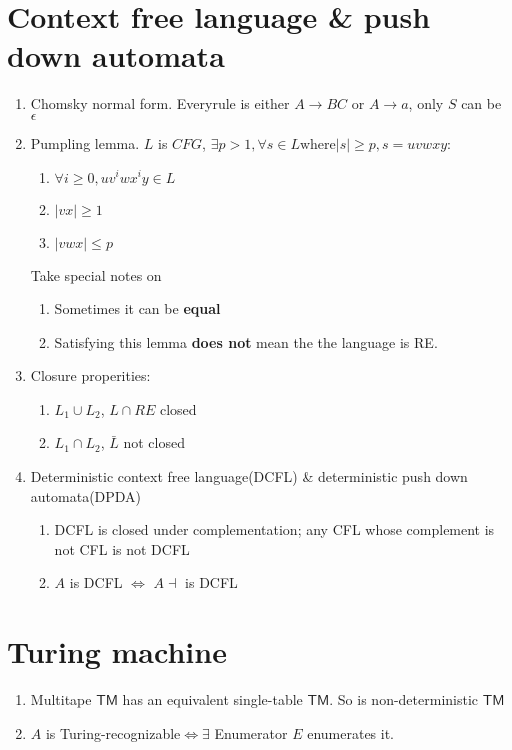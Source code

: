 \documentclass{article}
\newcommand{\TM}{\mathsf{TM}}
\newcommand{\TR}{Turing-recognizable}
\begin{document}
\section{Context free language \& push down automata}\begin{enumerate}
	\item Chomsky normal form. Everyrule is either $A \rightarrow BC$ or $A \rightarrow a$, only $S$ can be $\epsilon$
	\item Pumpling lemma. $L$ is $CFG$, $\exists p > 1, \forall s \in L \text{where} |s| \ge p, s = uvwxy$:
	\begin{enumerate}
		\item $\forall i \ge 0, uv^iwx^iy \in L$
		\item $|vx| \ge 1$
		\item $|vwx| \le p$
	\end{enumerate}
	Take special notes on
	\begin{enumerate}
		\item Sometimes it can be \textbf{equal}
		\item Satisfying this lemma \textbf{does not} mean the the language is RE.
	\end{enumerate}
	\item Closure properities:
	\begin{enumerate}
		\item $L_1 \cup L_2$, $L \cap RE$ closed
		\item $L_1 \cap L_2$, $\bar{L}$ not closed
	\end{enumerate}
	\item Deterministic context free language(DCFL) \& deterministic push down automata(DPDA)
	\begin{enumerate}
		\item DCFL is closed under complementation; any CFL whose complement is not CFL is not DCFL
		\item $A$ is DCFL $\Longleftrightarrow$ $A\dashv$ is DCFL
	\end{enumerate}
\end{enumerate}


\section{Turing machine}\begin{enumerate}
	\item Multitape $\TM$ has an equivalent single-table $\TM$. So is non-deterministic $\TM$
	\item $A$ is \TR $\Longleftrightarrow \exists$ Enumerator $E$ enumerates it.
\end{enumerate}
\end{document}
